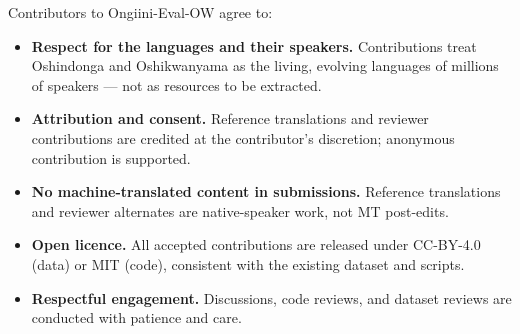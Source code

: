 \documentclass[11pt]{article}
\begin{document}
Contributors to Ongiini-Eval-OW agree to:

\begin{itemize}
\item \textbf{Respect for the languages and their speakers.}
  Contributions treat Oshindonga and Oshikwanyama as the living,
  evolving languages of millions of speakers --- not as resources
  to be extracted.
\item \textbf{Attribution and consent.} Reference translations and
  reviewer contributions are credited at the contributor's
  discretion; anonymous contribution is supported.
\item \textbf{No machine-translated content in submissions.}
  Reference translations and reviewer alternates are native-speaker
  work, not MT post-edits.
\item \textbf{Open licence.} All accepted contributions are
  released under CC-BY-4.0 (data) or MIT (code), consistent with
  the existing dataset and scripts.
\item \textbf{Respectful engagement.} Discussions, code reviews,
  and dataset reviews are conducted with patience and care.
\end{itemize}
\end{document}
